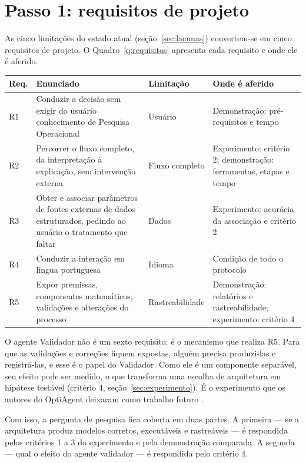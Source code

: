 \section{Passo 1: requisitos de projeto}
\label{sec:requisitos-projeto}

As cinco limitações do estado atual (seção~\ref{sec:lacunas}) convertem-se em cinco requisitos de projeto. O Quadro~\ref{q:requisitos} apresenta cada requisito e onde ele é aferido.

\begin{quadro}[htbp]
\caption{Requisitos de projeto e ponto de aferição}
\label{q:requisitos}
\centering
\small
\begin{tabularx}{\textwidth}{@{}l X l X@{}}
\toprule
Req. & Enunciado & Limitação & Onde é aferido \\
\midrule
R1 & Conduzir a decisão sem exigir do usuário conhecimento de Pesquisa Operacional & Usuário & Demonstração: pré-requisitos e tempo \\
R2 & Percorrer o fluxo completo, da interpretação à explicação, sem intervenção externa & Fluxo completo & Experimento: critério 2; demonstração: ferramentas, etapas e tempo \\
R3 & Obter e associar parâmetros de fontes externas de dados estruturados, pedindo ao usuário o tratamento que faltar & Dados & Experimento: acurácia da associação e critério 2 \\
R4 & Conduzir a interação em língua portuguesa & Idioma & Condição de todo o protocolo \\
R5 & Expor premissas, componentes matemáticos, validações e alterações do processo & Rastreabilidade & Demonstração: relatórios e rastreabilidade; experimento: critério 4 \\
\bottomrule
\end{tabularx}
\end{quadro}

O agente Validador não é um sexto requisito: é o mecanismo que realiza R5. Para que as validações e correções fiquem expostas, alguém precisa produzi-las e registrá-las, e esse é o papel do Validador. Como ele é um componente separável, seu efeito pode ser medido, o que transforma uma escolha de arquitetura em hipótese testável (critério 4, seção~\ref{sec:experimento}). É o experimento que os autores do OptiAgent deixaram como trabalho futuro \cite[p.~11]{monteiro2026}.

Com isso, a pergunta de pesquisa fica coberta em duas partes. A primeira --- se a arquitetura produz modelos corretos, executáveis e rastreáveis --- é respondida pelos critérios 1 a 3 do experimento e pela demonstração comparada. A segunda --- qual o efeito do agente validador --- é respondida pelo critério 4.

